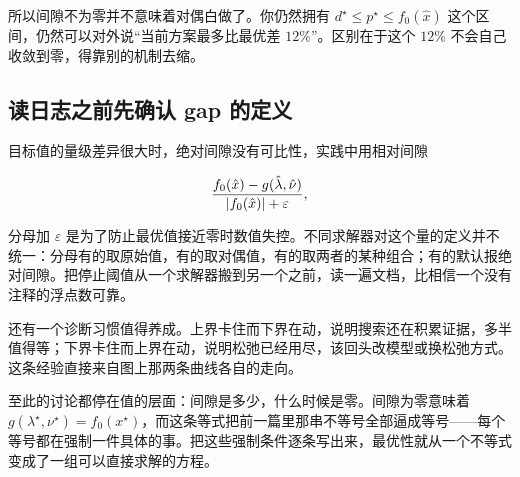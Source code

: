 所以间隙不为零并不意味着对偶白做了。你仍然拥有 \(d^\star\le p^\star\le f_0(\hat x)\) 这个区间，仍然可以对外说``当前方案最多比最优差 \(12\%\)''。区别在于这个 \(12\%\) 不会自己收敛到零，得靠别的机制去缩。

\subsection{读日志之前先确认 gap 的定义}

目标值的量级差异很大时，绝对间隙没有可比性，实践中用相对间隙

\[
\frac{f_0(\hat x)-g(\hat\lambda,\hat\nu)}{\left|f_0(\hat x)\right|+\varepsilon},
\]

分母加 \(\varepsilon\) 是为了防止最优值接近零时数值失控。不同求解器对这个量的定义并不统一：分母有的取原始值，有的取对偶值，有的取两者的某种组合；有的默认报绝对间隙。把停止阈值从一个求解器搬到另一个之前，读一遍文档，比相信一个没有注释的浮点数可靠。

还有一个诊断习惯值得养成。上界卡住而下界在动，说明搜索还在积累证据，多半值得等；下界卡住而上界在动，说明松弛已经用尽，该回头改模型或换松弛方式。这条经验直接来自图上那两条曲线各自的走向。

至此的讨论都停在值的层面：间隙是多少，什么时候是零。间隙为零意味着 \(g(\lambda^\star,\nu^\star)=f_0(x^\star)\)，而这条等式把前一篇里那串不等号全部逼成等号——每个等号都在强制一件具体的事。把这些强制条件逐条写出来，最优性就从一个不等式变成了一组可以直接求解的方程。
